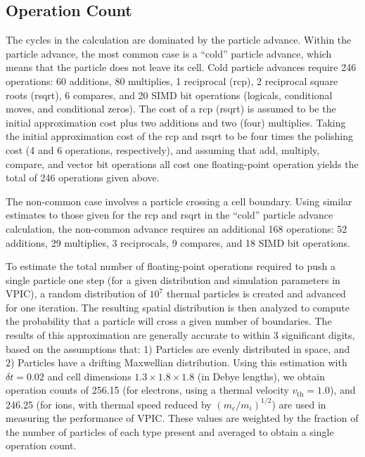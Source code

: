 \documentclass[letter,10pt]{article}
\begin{document}
\subsection{Operation Count}

The cycles in the calculation are dominated by the particle advance.
Within the particle advance, the most common case is a ``cold'' particle
advance, which means that the particle does not leave its cell.  Cold
particle advances require 246 operations:  60 additions, 80 multiplies, 1 
reciprocal (rcp),
2 reciprocal square roots (rsqrt), 6 compares, and 20 SIMD bit operations (logicals,
conditional moves, and conditional zeros).  The cost of a rcp 
(rsqrt) is assumed to be the initial approximation cost plus two additions and 
two (four) 
multiplies.  Taking the initial approximation cost of the rcp
and rsqrt to be four times the polishing cost (4 and 6 operations, respectively), and assuming that add, 
multiply, compare, and vector bit operations all cost one floating-point operation yields the total of 246 operations given above.

The non-common case involves a particle crossing a cell boundary.
Using similar estimates to those given for the rcp and rsqrt in the
``cold'' particle advance calculation, the non-common advance requires
an additional 168 operations: 52 additions, 29 multiplies, 3 reciprocals, 9 compares,
and 18 SIMD bit operations.

To estimate the total number of floating-point operations required to
push a single particle one step (for a given distribution and simulation
parameters in VPIC), a random distribution of $10^7$ thermal particles 
is created
and advanced for one iteration.  The resulting spatial distribution
is then analyzed to compute the probability that a particle will
cross a given number of boundaries.  The results of this approximation
are generally accurate to within 3 significant digits,
based on the assumptions that: 1) Particles are evenly distributed
in space, and 2) Particles have a drifting Maxwellian distribution.
Using this estimation with $\delta t = 0.02$ and cell
dimensions $1.3  \times 1.8 \times 1.8$ (in Debye lengths),
we obtain operation counts of 256.15 (for electrons,
using a thermal velocity $v_{\mathrm{th}} = 1.0$), and 246.25
(for ions, with thermal speed reduced by $(m_e/m_i)^{1/2}$)
are used in measuring the performance of VPIC.
These values are weighted by the fraction of the number of particles
of each type present
and averaged to obtain a single operation count.
\end{document}
